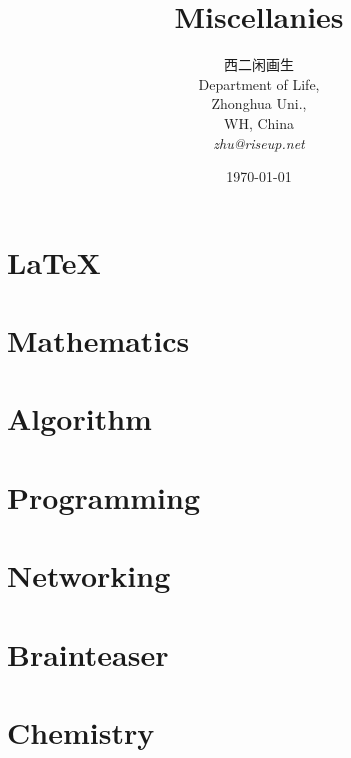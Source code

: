 \documentclass[a4paper,11pt]{book}
\begin{document}
\frontmatter{}

\title{Miscellanies}
\author{西二闲画生\\
  Department of Life,\\
  Zhonghua Uni.,\\
  WH, China\\
  \emph{zhu@riseup.net}}
\date{\today}
\maketitle



\setcounter{tocdepth}{3} %
\tableofcontents{}

\mainmatter{}

\part{\LaTeX{}}




\part{Mathematics}



\part{Algorithm}



\part{Programming}





\part{Networking}



\part{Brainteaser}



\part{Chemistry}
\label{part:chemistry}



\printbibliography[heading=bibintoc,title={Reference}]{}




\backmatter{}

\end{document}
